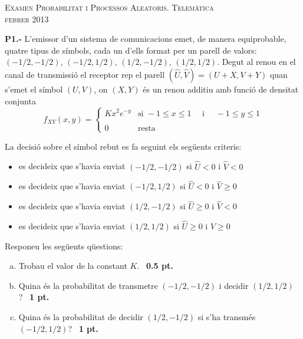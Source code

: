 \documentclass{report}
\begin{document}
\begin{center}
\textsc{Examen Probabilitat i Processos Aleatoris.
Telem\`{a}tica\\
febrer 2013}
\end{center}

\vspace{0.5 cm}
\noindent\textbf{P1.-}
L'emissor d'un sistema de comunicacions emet, de manera equiprobable, quatre
tipus de s\'imbols, cada un d'ells format per un parell de valors:
$(-1/2, -1/2)$, $(-1/2, 1/2)$, $(1/2, -1/2)$, $(1/2, 1/2)$. Degut al renou en el canal de
transmissi\'o el receptor rep el parell $(\hat{U}, \hat{V})=(U+X, V+Y)$ quan
s'emet el s\'imbol $(U, V)$, on $(X, Y)$ \'es un renou additiu amb funci\'o de
densitat conjunta
\[
f_{XY}(x, y)=\begin{cases}
K x^2 e^{-y} & \text{si } -1 \leq x \leq 1 \quad \text{ i } \quad -1 \leq y \leq 1 \\ \\
0 & \text{resta}
\end{cases}
\]

La decisi\'o sobre el s\'imbol rebut es fa seguint els seg\"uents criteris:
\begin{itemize}
\item es decideix que s'havia enviat $(-1/2, -1/2)$ si $\hat{U} < 0$ i $\hat{V} < 0$
\item es decideix que s'havia enviat $(-1/2, 1/2)$ si $\hat{U} < 0$ i $\hat{V} \geq 0$
\item es decideix que s'havia enviat $(1/2, -1/2)$ si $\hat{U} \geq 0$ i $\hat{V} < 0$
\item es decideix que s'havia enviat $(1/2, 1/2)$ si $\hat{U} \geq 0$ i $\hat{V} \geq 0$
\end{itemize}

Responeu les seg\"uents q\"uestions:
\begin{enumerate}[a)]
\item Trobau el valor de la constant $K$.\ \hfill{\textbf{ 0.5 pt.}}
\item Quina \'es la probabilitat de transmetre $(-1/2, -1/2)$ i decidir $(1/2, 1/2)$?\ \hfill{\textbf{ 1 pt.}}
\item Quina \'es la probabilitat de decidir $(1/2, -1/2)$ si s'ha transm\'es $(-1/2, 1/2)$?\ \hfill{\textbf{ 1 pt.}}
\end{enumerate}


\vspace{0.5 cm}
\end{document}
